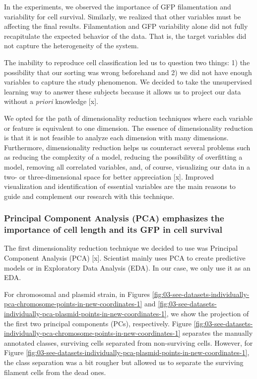 \documentclass[a4paper, nobind]{templates/ociamthesis}
\begin{document}
In the experiments, we observed the importance of GFP filamentation and variability for cell survival.
Similarly, we realized that other variables must be affecting the final results.
Filamentation and GFP variability alone did not fully recapitulate the expected behavior of the data.
That is, the target variables did not capture the heterogeneity of the system.

The inability to reproduce cell classification led us to question two things: 1) the possibility that our sorting was wrong beforehand and 2) we did not have enough variables to capture the study phenomenon.
We decided to take the unsupervised learning way to answer these subjects because it allows us to project our data without a \emph{priori} knowledge {[}x{]}.

We opted for the path of dimensionality reduction techniques where each variable or feature is equivalent to one dimension.
The essence of dimensionality reduction is that it is not feasible to analyze each dimension with many dimensions.
Furthermore, dimensionality reduction helps us counteract several problems such as reducing the complexity of a model, reducing the possibility of overfitting a model, removing all correlated variables, and, of course, visualizing our data in a two- or three-dimensional space for better appreciation {[}x{]}.
Improved visualization and identification of essential variables are the main reasons to guide and complement our research with this technique.

\hypertarget{principal-component-analysis-pca-emphasizes-the-importance-of-cell-length-and-its-gfp-in-cell-survival}{%
\subsubsection{Principal Component Analysis (PCA) emphasizes the importance of cell length and its GFP in cell survival}\label{principal-component-analysis-pca-emphasizes-the-importance-of-cell-length-and-its-gfp-in-cell-survival}}

The first dimensionality reduction technique we decided to use was Principal Component Analysis (PCA) {[}x{]}.
Scientist mainly uses PCA to create predictive models or in Exploratory Data Analysis (EDA).
In our case, we only use it as an EDA.

For chromosomal and plasmid strain, in Figures \ref{fig:03-see-datasets-individually-pca-chromosome-points-in-new-coordinates-1} and \ref{fig:03-see-datasets-individually-pca-plasmid-points-in-new-coordinates-1}, we show the projection of the first two principal components (PCs), respectively.
Figure \ref{fig:03-see-datasets-individually-pca-chromosome-points-in-new-coordinates-1} separates the manually annotated classes, surviving cells separated from non-surviving cells.
However, for Figure \ref{fig:03-see-datasets-individually-pca-plasmid-points-in-new-coordinates-1}, the class separation was a bit rougher but allowed us to separate the surviving filament cells from the dead ones.
\end{document}
